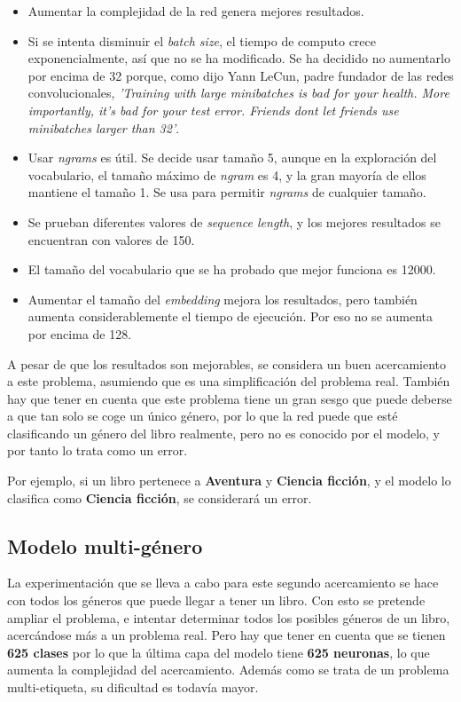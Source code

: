\documentclass[12pt,a4paper, xcolor=table]{article}
\begin{document}
\begin{itemize}
  \item Aumentar la complejidad de la red genera mejores resultados.
  \item Si se intenta disminuir el \textit{batch size}, el tiempo de computo crece exponencialmente, así que no se ha modificado. Se ha decidido no aumentarlo por encima de 32 porque, como dijo Yann LeCun, padre fundador de las redes convolucionales, \textit{'Training with large minibatches is bad for your health. More importantly, it's bad for your test error. Friends dont let friends use minibatches larger than 32'}\cite{friends}.
  \item Usar \textit{ngrams} es útil. Se decide usar tamaño 5, aunque en la exploración del vocabulario, el tamaño máximo de \textit{ngram} es 4, y la gran mayoría de ellos mantiene el tamaño 1. Se usa para permitir \textit{ngrams} de cualquier tamaño.
  \item Se prueban diferentes valores de \textit{sequence length}, y los mejores resultados se encuentran con valores de 150.
  \item El tamaño del vocabulario que se ha probado que mejor funciona es 12000.
  \item Aumentar el tamaño del \textit{embedding} mejora los resultados, pero también aumenta considerablemente el tiempo de ejecución. Por eso no se aumenta por encima de 128.
\end{itemize}

  A pesar de que los resultados son mejorables, se considera un buen acercamiento a este problema, asumiendo que es una simplificación del problema real. También hay que tener en cuenta que este problema tiene un gran sesgo que puede deberse a que tan solo se coge un único género, por lo que la red puede que esté clasificando un género del libro realmente, pero no es conocido por el modelo, y por tanto lo trata como un error.

  \vspace{2mm}

  Por ejemplo, si un libro pertenece a \textbf{Aventura} y \textbf{Ciencia ficción}, y el modelo lo clasifica como \textbf{Ciencia ficción}, se considerará un error.



\subsection{Modelo multi-género}

La experimentación que se lleva a cabo para este segundo acercamiento se hace con todos los géneros que puede llegar a tener un libro. Con esto se pretende ampliar el problema, e intentar determinar todos los posibles géneros de un libro, acercándose más a un problema real. Pero hay que tener en cuenta que se tienen \textbf{625 clases} por lo que la última capa del modelo tiene \textbf{625 neuronas}, lo que aumenta la complejidad del acercamiento. Además como se trata de un problema multi-etiqueta, su dificultad es todavía mayor.
\end{document}
